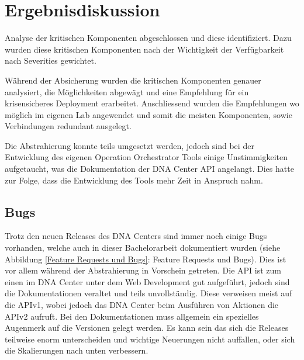 \section{Ergebnisdiskussion}

Analyse der kritischen Komponenten abgeschlossen und diese identifiziert. Dazu wurden diese kritischen Komponenten nach der Wichtigkeit der Verfügbarkeit nach Severities gewichtet. 

Während der Absicherung wurden die kritischen Komponenten genauer analysiert, die Möglichkeiten abgewägt und eine Empfehlung für ein krisensicheres Deployment erarbeitet. Anschliessend wurden die Empfehlungen wo möglich im eigenen Lab angewendet und somit die meisten Komponenten, sowie Verbindungen redundant ausgelegt.

Die Abstrahierung konnte teils umgesetzt werden, jedoch sind bei der Entwicklung des eigenen Operation Orchestrator Tools einige Unstimmigkeiten aufgetaucht, was die Dokumentation der DNA Center API angelangt. Dies hatte zur Folge, dass die Entwicklung des Tools mehr Zeit in Anspruch nahm.

\subsection{Bugs}
Trotz den neuen Releases des DNA Centers sind immer noch einige Bugs vorhanden, welche auch in dieser Bachelorarbeit dokumentiert wurden (siehe Abbildung \ref{Feature Requests und Bugs}: Feature Requests und Bugs). Dies ist vor allem während der Abstrahierung in Vorschein getreten. Die API ist zum einen im DNA Center unter dem Web Development gut aufgeführt, jedoch sind die Dokumentationen veraltet und teils unvollständig. Diese verweisen meist auf die APIv1, wobei jedoch das DNA Center beim Ausführen von Aktionen die APIv2 aufruft. Bei den Dokumentationen muss allgemein ein spezielles Augenmerk auf die Versionen gelegt werden. Es kann sein das sich die Releases teilweise enorm unterscheiden und wichtige Neuerungen nicht auffallen, oder sich die Skalierungen nach unten verbessern.

